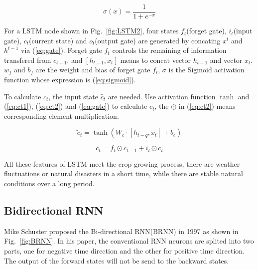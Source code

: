 \documentclass[conference, a4paper]{IEEEtran}
\begin{document}
    \begin{equation}
      \sigma \left( x \right) =\frac{1}{1+e^{-x}}
      \label{eq:sigmoid}
    \end{equation}

    For a LSTM node shown in Fig.~\ref{fig:LSTM2}, four states $f_t$(forget gate), $i_t$(input gate), $c_t$(current state) and $o_t$(output gate) are generated by concating $x^t$ and $h^{t-1}$ via (\ref{eq:gate}). Forget gate $f_t$ controls the remaining of information transfered from $c_{t-1}$, and $[h_{t-1}, x_t]$ means to concat vector $h_{t-1}$ and vector $x_t$. $w_f$ and $b_f$ are the weight and bias of forget gate $f_t$, $\sigma$ is the Sigmoid activation function whose expression is (\ref{eq:sigmoid}).

    To calculate $c_t$, the input state $\widetilde{c_t}$ are needed. Use activation function $\tanh$ and (\ref{eq:ct1}), (\ref{eq:ct2}) and (\ref{eq:gate}) to calculate $c_t$, the $\odot$ in (\ref{eq:ct2}) means corresponding element multiplication.

    \begin{equation}
      \tilde{c}_t=\tanh \left( W_c\cdot \left[ h_{t-q},x_t \right] +b_c \right)
      \label{eq:ct1}
    \end{equation}

    \begin{equation}
      c_t=f_t\odot c_{t-1}+i_t\odot c_t
      \label{eq:ct2}
    \end{equation}

    All these features of LSTM meet the crop growing process, there are weather fluctuations or natural disasters in a short time, while there are stable natural conditions over a long period.

  \subsection{Bidirectional RNN}
    Mike Schuster \cite{schusterBidirectionalRecurrentNeural1997} proposed the Bi-directional RNN(BRNN) in 1997 as shown in Fig.~\ref{fig:BRNN}. In his paper, the conventional RNN neurons are splited into two parts, one for negative time direction and the other for positive time direction. The output of the forward states will not be send to the backward states. 
\end{document}
